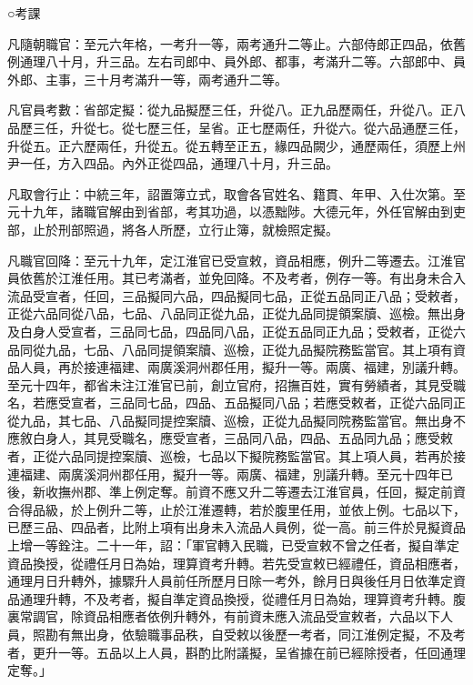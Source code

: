 
\begin{pinyinscope}

 ○考課



 凡隨朝職官：至元六年格，一考升一等，兩考通升二等止。六部侍郎正四品，依舊例通理八十月，升三品。左右司郎中、員外郎、都事，考滿升二等。六部郎中、員外郎、主事，三十月考滿升一等，兩考通升二等。



 凡官員考數：省部定擬：從九品擬歷三任，升從八。正九品歷兩任，升從八。正八品歷三任，升從七。從七歷三任，呈省。正七歷兩任，升從六。從六品通歷三任，升從五。正六歷兩任，升從五。從五轉至正五，緣四品闕少，通歷兩任，須歷上州尹一任，方入四品。內外正從四品，通理八十月，升三品。



 凡取會行止：中統三年，詔置簿立式，取會各官姓名、籍貫、年甲、入仕次第。至元十九年，諸職官解由到省部，考其功過，以憑黜陟。大德元年，外任官解由到吏部，止於刑部照過，將各人所歷，立行止簿，就檢照定擬。



 凡職官回降：至元十九年，定江淮官已受宣敕，資品相應，例升二等遷去。江淮官員依舊於江淮任用。其已考滿者，並免回降。不及考者，例存一等。有出身未合入流品受宣者，任回，三品擬同六品，四品擬同七品，正從五品同正八品；受敕者，正從六品同從八品，七品、八品同正從九品，正從九品同提領案牘、巡檢。無出身及白身人受宣者，三品同七品，四品同八品，正從五品同正九品；受敕者，正從六品同從九品，七品、八品同提領案牘、巡檢，正從九品擬院務監當官。其上項有資品人員，再於接連福建、兩廣溪洞州郡任用，擬升一等。兩廣、福建，別議升轉。至元十四年，都省未注江淮官已前，創立官府，招撫百姓，實有勞績者，其見受職名，若應受宣者，三品同七品，四品、五品擬同八品；若應受敕者，正從六品同正從九品，其七品、八品擬同提控案牘、巡檢，正從九品擬同院務監當官。無出身不應敘白身人，其見受職名，應受宣者，三品同八品，四品、五品同九品；應受敕者，正從六品同提控案牘、巡檢，七品以下擬院務監當官。其上項人員，若再於接連福建、兩廣溪洞州郡任用，擬升一等。兩廣、福建，別議升轉。至元十四年已後，新收撫州郡、準上例定奪。前資不應又升二等遷去江淮官員，任回，擬定前資合得品級，於上例升二等，止於江淮遷轉，若於腹里任用，並依上例。七品以下，已歷三品、四品者，比附上項有出身未入流品人員例，從一高。前三件於見擬資品上增一等銓注。二十一年，詔：「軍官轉入民職，已受宣敕不曾之任者，擬自準定資品換授，從禮任月日為始，理算資考升轉。若先受宣敕已經禮任，資品相應者，通理月日升轉外，據驟升人員前任所歷月日除一考外，餘月日與後任月日依準定資品通理升轉，不及考者，擬自準定資品換授，從禮任月日為始，理算資考升轉。腹裏常調官，除資品相應者依例升轉外，有前資未應入流品受宣敕者，六品以下人員，照勘有無出身，依驗職事品秩，自受敕以後歷一考者，同江淮例定擬，不及考者，更升一等。五品以上人員，斟酌比附議擬，呈省據在前已經除授者，任回通理定奪。」




\end{pinyinscope}
